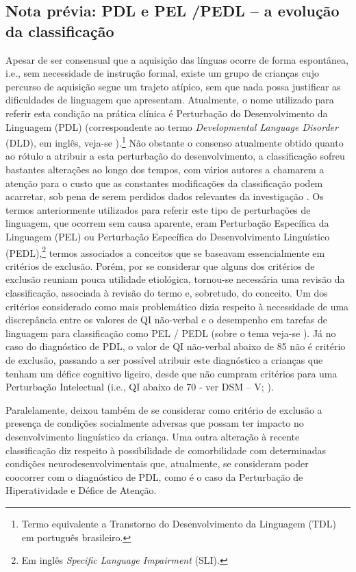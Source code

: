 \documentclass[output=paper,colorlinks,citecolor=brown,booklanguage=portuguese]{langscibook}
\begin{document}
\subsection{Nota prévia: PDL e PEL /PEDL – a evolução da classificação}
Apesar de ser consensual que a aquisição das línguas ocorre de forma espontânea, i.e., sem necessidade de instrução formal, existe um grupo de crianças cujo percurso de aquisição segue um trajeto atípico, sem que nada possa justificar as dificuldades de linguagem que apresentam. Atualmente, o nome utilizado para referir esta condição na prática clínica é Perturbação do Desenvolvimento da Linguagem (PDL) (correspondente ao termo \emph{Developmental Language Disorder} (DLD), em inglês, veja-se \citealp{Bishop2017}).\footnote{Termo equivalente a Transtorno do Desenvolvimento da Linguagem (TDL) em português brasileiro.} Não obstante o consenso atualmente obtido quanto ao rótulo a atribuir a esta perturbação do desenvolvimento, a classificação sofreu bastantes alterações ao longo dos tempos, com vários autores a chamarem a atenção para o custo que as constantes modificações da classificação podem acarretar, sob pena de serem perdidos dados relevantes da investigação \citep{Ebbels2014a}. Os termos anteriormente utilizados para referir este tipo de perturbações de linguagem, que ocorrem sem causa aparente, eram Perturbação Específica da Linguagem (PEL) ou Perturbação Específica do Desenvolvimento Linguístico (PEDL),\footnote{Em inglês \emph{Specific Language Impairment} (SLI).} termos associados a conceitos que se baseavam essencialmente em critérios de exclusão. Porém, por se considerar que alguns dos critérios de exclusão reuniam pouca utilidade etiológica, tornou-se necessária uma revisão da classificação, associada à revisão do termo e, sobretudo, do conceito. Um dos critérios considerado como mais problemático dizia respeito à necessidade de uma discrepância entre os valores de QI não-verbal e o desempenho em tarefas de linguagem para classificação como PEL / PEDL (sobre o tema veja-se \citealp{Bishop1994, Jakubowicz2008}). Já no caso do diagnóstico de PDL, o valor de QI não-verbal abaixo de 85 não é critério de exclusão, passando a ser possível atribuir este diagnóstico a crianças que tenham um défice cognitivo ligeiro, desde que não cumpram critérios para uma Perturbação Intelectual (i.e., QI abaixo de 70 - ver DSM – V; \citealp{Association2013}).

Paralelamente, deixou também de se considerar como critério de exclusão a presença de condições socialmente adversas que possam ter impacto no desenvolvimento linguístico da criança. Uma outra alteração à recente classificação diz respeito à possibilidade de comorbilidade com determinadas condições neurodesenvolvimentais que, atualmente, se consideram poder coocorrer com o diagnóstico de PDL, como é o caso da Perturbação de Hiperatividade e Défice de Atenção. 
\end{document}
